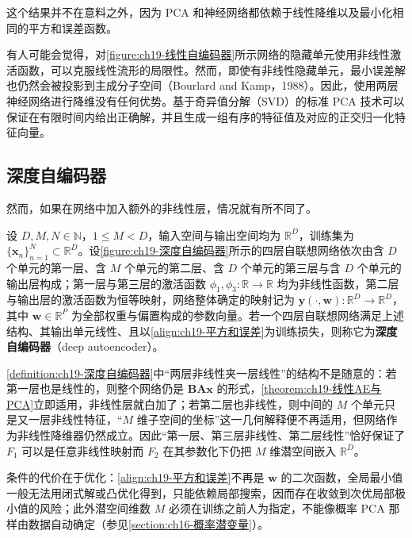 \documentclass[../../main.tex]{subfiles}
\begin{document}
这个结果并不在意料之外，因为 PCA 和神经网络都依赖于线性降维以及最小化相同的平方和误差函数。

有人可能会觉得，对\cref{figure:ch19-线性自编码器}所示网络的隐藏单元使用非线性激活函数，可以克服线性流形的局限性。然而，即使有非线性隐藏单元，最小误差解也仍然会被投影到主成分子空间（Bourlard and Kamp，1988）。因此，使用两层神经网络进行降维没有任何优势。基于奇异值分解（SVD）的标准 PCA 技术可以保证在有限时间内给出正确解，并且生成一组有序的特征值及对应的正交归一化特征向量。

\subsection{深度自编码器}\label{subsection:ch19-深度自编码器}

然而，如果在网络中加入额外的非线性层，情况就有所不同了。

\begin{definition}[深度自编码器]\label{definition:ch19-深度自编码器}
设 $D,M,N\in\mathbb{N}$，$1\leqslant M<D$，输入空间与输出空间均为 $\mathbb{R}^{D}$，训练集为 $\{\bm{x}_{n}\}_{n=1}^{N}\subset\mathbb{R}^{D}$。设\cref{figure:ch19-深度自编码器}所示的四层自联想网络依次由含 $D$ 个单元的第一层、含 $M$ 个单元的第二层、含 $D$ 个单元的第三层与含 $D$ 个单元的输出层构成；第一层与第三层的激活函数 $\phi_{1},\phi_{3}:\mathbb{R}\to\mathbb{R}$ 均为非线性函数，第二层与输出层的激活函数为恒等映射，网络整体确定的映射记为 $\bm{y}(\cdot,\bm{w}):\mathbb{R}^{D}\to\mathbb{R}^{D}$，其中 $\bm{w}\in\mathbb{R}^{P}$ 为全部权重与偏置构成的参数向量。若一个四层自联想网络满足上述结构、其输出单元线性、且以\eqref{align:ch19-平方和误差}为训练损失，则称它为\textbf{深度自编码器}（deep autoencoder）。
\end{definition}

\begin{remark}
\cref{definition:ch19-深度自编码器}中“两层非线性夹一层线性”的结构不是随意的：若第一层也是线性的，则整个网络仍是 $\bm{B}\bm{A}\bm{x}$ 的形式，\cref{theorem:ch19-线性AE与PCA}立即适用，非线性层就白加了；若第二层也非线性，则中间的 $M$ 个单元只是又一层非线性特征，“$M$ 维子空间的坐标”这一几何解释便不再适用，但网络作为非线性降维器仍然成立。因此“第一层、第三层非线性、第二层线性”恰好保证了 $F_1$ 可以是任意非线性映射而 $F_2$ 在其参数化下仍把 $M$ 维潜空间嵌入 $\mathbb{R}^{D}$。

条件的代价在于优化：\eqref{align:ch19-平方和误差}不再是 $\bm{w}$ 的二次函数，全局最小值一般无法用闭式解或凸优化得到，只能依赖局部搜索，因而存在收敛到次优局部极小值的风险；此外潜空间维数 $M$ 必须在训练之前人为指定，不能像概率 PCA 那样由数据自动确定（参见\cref{section:ch16-概率潜变量}）。
\end{remark}
\end{document}
